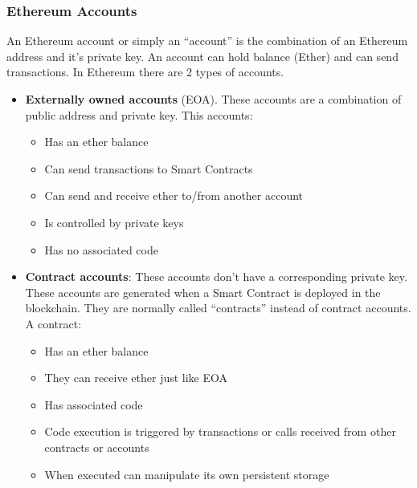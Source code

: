 \documentclass[a4paper, 12pt]{article} %
\begin{document}
        \subsubsection{Ethereum Accounts}
            An Ethereum account or simply an “account” is the combination of an Ethereum address and it’s private key. An account can hold balance (Ether) and can send transactions. In Ethereum there are 2 types of accounts.
            \begin{itemize}
                \item \textbf{Externally owned accounts} (EOA). These accounts are a combination of public address and private key. This accounts:
                \begin{itemize}
                    \item Has an ether balance
                    \item Can send transactions to Smart Contracts
                    \item Can send and receive ether to/from another account
                    \item Is controlled by private keys
                    \item Has no associated code
                \end{itemize}
                \item \textbf{Contract accounts}: These accounts don’t have a corresponding private key. These accounts are generated when a Smart Contract is deployed in the blockchain. They are normally called “contracts” instead of contract accounts. A contract:
                \begin{itemize}
                    \item Has an ether balance
                    \item They can receive ether just like EOA
                    \item Has associated code
                    \item Code execution is triggered by transactions or calls received from other contracts or accounts
                    \item When executed can manipulate its own persistent storage
                \end{itemize}
            \end{itemize}
        
\end{document}
